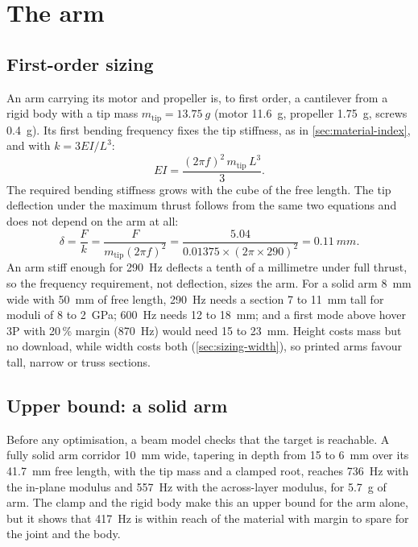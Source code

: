 \section{The arm}\label{sec:arch-arm}

\subsection{First-order sizing}

An arm carrying its motor and propeller is, to first order, a cantilever from a rigid body with a tip mass $m_\text{tip} = \SI{13.75}{g}$ (motor \SI{11.6}{g}, propeller \SI{1.75}{g}, screws \SI{0.4}{g}). Its first bending frequency fixes the tip stiffness, as in \cref{sec:material-index}, and with $k = 3EI/L^3$:
\begin{equation}
EI = \frac{(2\pi f)^2\, m_\text{tip}\, L^3}{3}.
\end{equation}
The required bending stiffness grows with the cube of the free length. The tip deflection under the maximum thrust follows from the same two equations and does not depend on the arm at all:
\begin{equation}
\delta = \frac{F}{k} = \frac{F}{m_\text{tip}(2\pi f)^2} = \frac{5.04}{0.01375 \times (2\pi \times 290)^2} = \SI{0.11}{mm}.
\end{equation}
An arm stiff enough for \SI{290}{Hz} deflects a tenth of a millimetre under full thrust, so the frequency requirement, not deflection, sizes the arm. For a solid arm \SI{8}{mm} wide with \SI{50}{mm} of free length, \SI{290}{Hz} needs a section 7 to \SI{11}{mm} tall for moduli of 8 to \SI{2}{GPa}; \SI{600}{Hz} needs 12 to \SI{18}{mm}; and a first mode above hover 3P with 20\,\% margin (\SI{870}{Hz}) would need 15 to \SI{23}{mm}. Height costs mass but no download, while width costs both (\cref{sec:sizing-width}), so printed arms favour tall, narrow or truss sections.

\subsection{Upper bound: a solid arm}

Before any optimisation, a beam model checks that the target is reachable. A fully solid arm corridor \SI{10}{mm} wide, tapering in depth from 15 to \SI{6}{mm} over its \SI{41.7}{mm} free length, with the tip mass and a clamped root, reaches \SI{736}{Hz} with the in-plane modulus and \SI{557}{Hz} with the across-layer modulus, for \SI{5.7}{g} of arm. The clamp and the rigid body make this an upper bound for the arm alone, but it shows that \SI{417}{Hz} is within reach of the material with margin to spare for the joint and the body.

